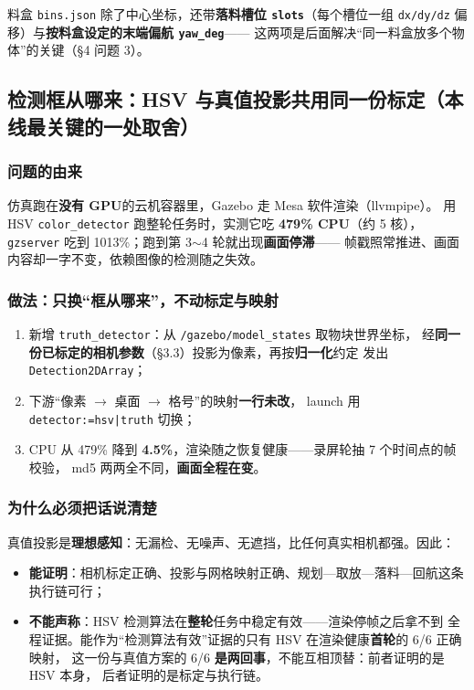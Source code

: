 \documentclass[12pt,a4paper]{ctexart}
\begin{document}
料盒 \texttt{bins.json} 除了中心坐标，还带\textbf{落料槽位 \texttt{slots}}（每个槽位一组
\texttt{dx/dy/dz} 偏移）与\textbf{按料盒设定的末端偏航 \texttt{yaw\_deg}}——
这两项是后面解决“同一料盒放多个物体”的关键（§4 问题 3）。

\subsection{检测框从哪来：HSV 与真值投影共用同一份标定（本线最关键的一处取舍）}

\subsubsection*{问题的由来}

仿真跑在\textbf{没有 GPU}的云机容器里，Gazebo 走 Mesa 软件渲染（llvmpipe）。
用 HSV \texttt{color\_detector} 跑整轮任务时，实测它吃 \textbf{479\% CPU}（约 5 核），
\texttt{gzserver} 吃到 1013\%；跑到第 3$\sim$4 轮就出现\textbf{画面停滞}——
帧戳照常推进、画面内容却一字不变，依赖图像的检测随之失效。

\subsubsection*{做法：只换“框从哪来”，不动标定与映射}

\begin{enumerate}[leftmargin=1.8em]
  \item 新增 \texttt{truth\_detector}：从 \texttt{/gazebo/model\_states} 取物块世界坐标，
        经\textbf{同一份已标定的相机参数}（§3.3）投影为像素，再按\textbf{归一化}约定
        发出 \texttt{Detection2DArray}；
  \item 下游“像素 $\to$ 桌面 $\to$ 格号”的映射\textbf{一行未改}，
        launch 用 \texttt{detector:=hsv|truth} 切换；
  \item CPU 从 479\% 降到 \textbf{4.5\%}，渲染随之恢复健康——录屏轮抽 7 个时间点的帧校验，
        md5 两两全不同，\textbf{画面全程在变}。
\end{enumerate}

\subsubsection*{为什么必须把话说清楚}

真值投影是\textbf{理想感知}：无漏检、无噪声、无遮挡，比任何真实相机都强。因此：

\begin{itemize}[leftmargin=1.6em]
  \item \textbf{能证明}：相机标定正确、投影与网格映射正确、规划—取放—落料—回航这条执行链可行；
  \item \textbf{不能声称}：HSV 检测算法在\textbf{整轮}任务中稳定有效——渲染停帧之后拿不到
        全程证据。能作为“检测算法有效”证据的只有 HSV 在渲染健康\textbf{首轮}的 6/6 正确映射，
        这一份与真值方案的 6/6 \textbf{是两回事}，不能互相顶替：前者证明的是 HSV 本身，
        后者证明的是标定与执行链。
\end{itemize}
\end{document}
